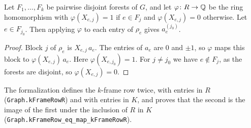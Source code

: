 \begin{lemma}
  \label{lem:k-frame-specialize-identity}
  \leanok
  Let $F_1, \dots, F_k$ be pairwise disjoint forests of $G$, and let
  $\varphi \colon R \to {\mathbb{Q}}$ be the ring homomorphism with
  $\varphi(X_{e,j}) = 1$ if $e \in F_j$ and $\varphi(X_{e,j}) = 0$
  otherwise. Let $e \in F_{j_0}$. Then applying $\varphi$ to each entry
  of $\rho_e$ gives $a_e^{(j_0)}$.
\end{lemma}
\begin{proof}
  \leanok
  Block $j$ of $\rho_e$ is $X_{e,j}\, a_e$. The entries of $a_e$ are
  $0$ and $\pm 1$, so $\varphi$ maps this block to
  $\varphi(X_{e,j})\, a_e$. Here $\varphi(X_{e,j_0}) = 1$. For
  $j \ne j_0$ we have $e \notin F_j$, as the forests are disjoint, so
  $\varphi(X_{e,j}) = 0$.
\end{proof}
\begin{fmlnote}
  The formalization defines the $k$-frame row twice, with entries in
  $R$ (\texttt{Graph.kFrameRowR}) and with entries in $K$, and proves
  that the second is the image of the first under the inclusion of $R$
  in $K$
  (\texttt{Graph.\allowbreak{}kFrameRow\_\allowbreak{}eq\_\allowbreak{}map\_\allowbreak{}kFrameRowR}).
\end{fmlnote}

